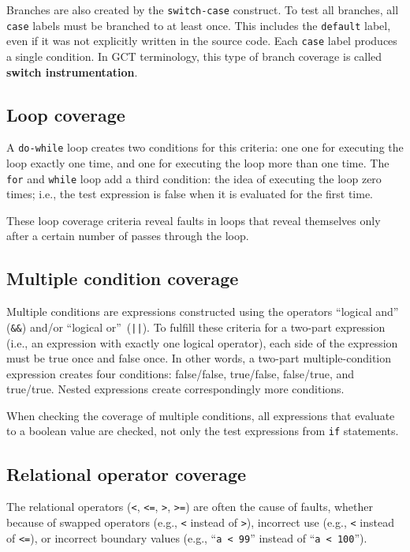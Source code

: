 Branches are also created by the {\tt switch-case} construct.
To test all branches, all {\tt case} labels must be branched to at
least once.  This includes the {\tt default} label, even if it was not
explicitly written in the source code.  Each {\tt case} label produces
a single condition.  In GCT terminology, this type of branch coverage
is called {\bf switch instrumentation}.

\subsection*{Loop coverage}

A {\tt do-while} loop creates two conditions for this criteria: one
 one for executing the loop exactly one time, and one for executing
the loop more than one time. 
The {\tt for} and {\tt while} loop add a third condition: the idea of
executing the loop zero times; i.e., the test expression is false when
it is evaluated for the first time.

These loop coverage criteria reveal faults in loops that reveal
themselves only after a certain number of passes through the loop.


\subsection*{Multiple condition coverage}

Multiple conditions are expressions constructed using the operators
``logical and'' ({\tt \&\&}) and/or ``logical or''~({\tt{||}}).  To
fulfill these criteria for a two-part expression (i.e., an expression
with exactly one logical operator), each side of the expression must
be true once and false once.  In other words, a two-part
multiple-condition expression creates four conditions: false/false,
true/false, false/true, and true/true.  Nested expressions create
correspondingly more conditions.

When checking the coverage of multiple conditions, all expressions
that evaluate to a boolean value are checked, not only the test
expressions from {\tt if} statements.

\subsection*{Relational operator coverage}

The relational operators ({\tt <}, {\tt <=}, {\tt >}, {\tt >=}) 
are often the cause of faults, whether because of swapped
operators (e.g., {\tt <} instead of {\tt >}), incorrect use
(e.g., {\tt <} instead of {\tt <=}), or incorrect boundary
values (e.g., ``{\tt a < 99}'' instead of ``{\tt a < 100}'').

